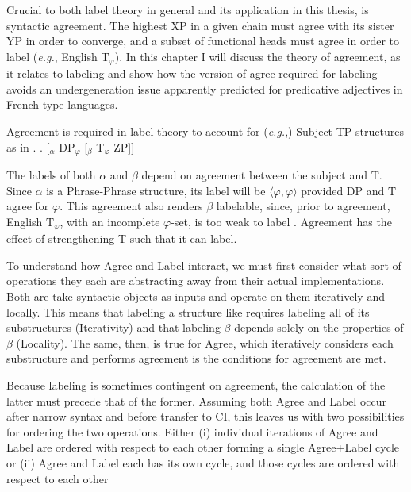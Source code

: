 \documentclass[MilwayThesis]{subfiles}
\begin{document}
Crucial to both label theory in general and its application in this thesis, is syntactic agreement.
The highest XP in a given chain must agree with its sister YP in order to converge, and a subset of functional heads must agree in order to label (\textit{e.g.}, English T$_\varphi$).
In this chapter I will discuss the theory of agreement, as it relates to labeling and show how the version of agree required for labeling avoids an undergeneration issue apparently predicted for predicative adjectives in French-type languages.

Agreement is required in label theory to account for (\textit{e.g.},) Subject-TP structures as in \Next.
\ex. [$_\alpha$ DP$_\varphi$ [$_\beta$ T$_\varphi$ ZP]]

The labels of both $\alpha$ and $\beta$ depend on agreement between the subject and T.
Since $\alpha$ is a Phrase-Phrase structure, its label will be $\langle\varphi,\varphi\rangle$ provided DP and T agree for $\varphi$.
This agreement also renders $\beta$ labelable, since, prior to agreement, English T$_\varphi$, with an incomplete $\varphi$-set, is too weak to label \parencite{chomsky2013problems}.
Agreement has the effect of strengthening T such that it can label.

To understand how Agree and Label interact, we must first consider what sort of operations they each are abstracting away from their actual implementations.
Both are take syntactic objects as inputs and operate on them iteratively and locally.
This means that labeling a structure like \Last requires labeling all of its substructures (Iterativity) and that labeling $\beta$ depends solely on the properties of $\beta$ (Locality).
The same, then, is true for Agree, which iteratively considers each substructure and performs agreement is the conditions for agreement are met.

Because labeling is sometimes contingent on agreement, the calculation of the latter must precede that of the former.
Assuming both Agree and Label occur after narrow syntax and before transfer to CI, this leaves us with two possibilities for ordering the two operations.
Either (i) individual iterations of Agree and Label are ordered with respect to each other forming a single Agree+Label cycle or (ii) Agree and Label each has its own cycle, and those cycles are ordered with respect to each other  
\end{document}
